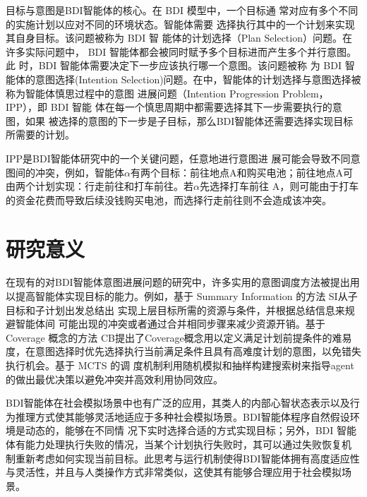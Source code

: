 目标与意图是BDI智能体的核心。在 BDI 模型中，一个目标通 常对应有多个不同的实施计划以应对不同的环境状态。智能体需要 选择执行其中的一个计划来实现其自身目标。该问题被称为 BDI 智 能体的计划选择（Plan Selection）问题\cite{yao2017robust}。在许多实际问题中， BDI 智能体都会被同时赋予多个目标进而产生多个并行意图。此 时，BDI 智能体需要决定下一步应该执行哪一个意图。该问题被称 为 BDI 智能体的意图选择(Intention Selection)问题\cite{yao2017robust}。在\cite{DBLP:conf/emas/Castle-GreenDL20}中，智能体的计划选择与意图选择被称为智能体慎思过程中的意图 进展问题（Intention Progression Problem， IPP），即 BDI 智能 体在每一个慎思周期中都需要选择其下一步需要执行的意图，如果 被选择的意图的下一步是子目标，那么BDI智能体还需要选择实现目标所需要的计划。


IPP是BDI智能体研究中的一个关键问题，任意地进行意图进 展可能会导致不同意图间的冲突，例如，智能体$\alpha$有两个目标：前往地点A和购买电池；前往地点A可由两个计划实现：行走前往和打车前往。若$\alpha$先选择打车前往 A，则可能由于打车的资金花费而导致后续没钱购买电池，而选择行走前往则不会造成该冲突。
\section{研究意义}
在现有的对BDI智能体意图进展问题的研究中，许多实用的意图调度方法被提出用以提高智能体实现目标的能力。例如，基于 Summary Information 的方法 SI\cite{DBLP:journals/jar/ThangarajahP11}从子目标和子计划出发总结出 实现上层目标所需的资源与条件，并根据总结信息来规避智能体间 可能出现的冲突或者通过合并相同步骤来减少资源开销。基于 Coverage 概念的方法 CB\cite{DBLP:journals/aamas/WatersPS15,DBLP:conf/atal/WatersPS14,DBLP:conf/aamas/ThangarajahSP12}提出了Coverage概念用以定义满足计划前提条件的难易度，在意图选择时优先选择执行当前满足条件且具有高难度计划的意图，以免错失执行机会。基于 MCTS 的调 度机制\cite{DBLP:conf/aaai/YaoLT16,DBLP:conf/atal/YaoL16,DBLP:conf/ecai/YaoLT14}利用随机模拟和抽样构建搜索树来指导agent的做出最优决策以避免冲突并高效利用协同效应。

BDI智能体在社会模拟场景中也有广泛的应用\cite{DBLP:conf/ijcai/SinghSPJ11}，其类人的内部心智状态表示以及行为推理方式使其能够灵活地适应于多种社会模拟场景。BDI智能体程序自然假设环境是动态的，能够在不同情 况下实时选择合适的方式实现目标；另外，BDI 智能体有能力处理执行失败的情况，当某个计划执行失败时，其可以通过失败恢复机 制重新考虑如何实现当前目标。此思考与运行机制使得BDI智能体拥有高度适应性与灵活性，并且与人类操作方式非常类似，这使其有能够合理应用于社会模拟场景。

